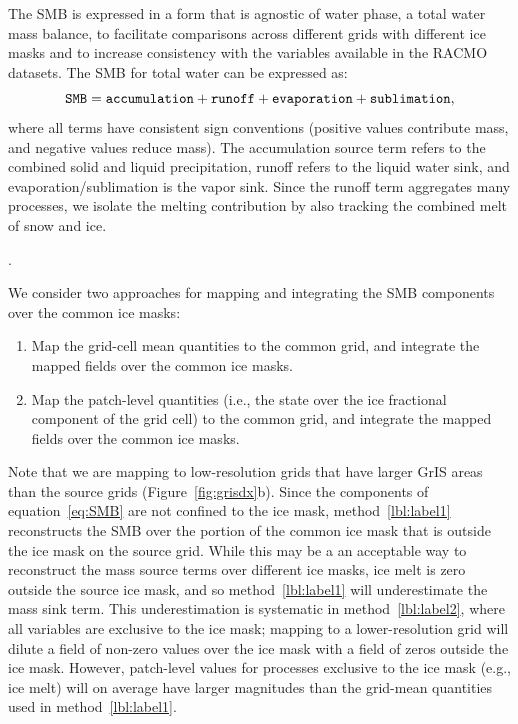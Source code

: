\documentclass[draft]{agujournal2019}
\begin{document}
The SMB is expressed in a form that is agnostic of water phase, a total water mass balance, to facilitate comparisons across different grids with different ice masks and to increase consistency with the variables available in the RACMO datasets. The SMB for total water can be expressed as:
\begin{equation}
\tt SMB = accumulation + runoff + evaporation + sublimation, \label{eq:SMB}
\end{equation}
where all terms have consistent sign conventions (positive values contribute mass, and negative values reduce mass). The accumulation source term refers to the combined solid and liquid precipitation, runoff refers to the liquid water sink, and evaporation/sublimation is the vapor sink. Since the runoff term aggregates many processes, we isolate the melting contribution by also tracking the combined melt of snow and ice. 

{}.

We consider two approaches for mapping and integrating the SMB components over the common ice masks:
\begin{enumerate}
\item Map the grid-cell mean quantities to the common grid, and integrate the mapped fields over the common ice masks. \label{lbl:label1}
\item Map the patch-level quantities (i.e., the state over the ice fractional component of the grid cell) to the common grid, and integrate the mapped fields over the common ice masks. \label{lbl:label2}
\end{enumerate}

Note that we are mapping to low-resolution grids that have larger GrIS areas than the source grids (Figure~\ref{fig:grisdx}b). Since the components of equation~\ref{eq:SMB} are not confined to the ice mask, method~\ref{lbl:label1} reconstructs the SMB over the portion of the common ice mask that is outside the ice mask on the source grid. While this may be a an acceptable way to reconstruct the mass source terms over different ice masks, ice melt is zero outside the source ice mask, and so method~\ref{lbl:label1} will underestimate the mass sink term. This underestimation is systematic in method~\ref{lbl:label2}, where all variables are exclusive to the ice mask; mapping to a lower-resolution grid will dilute a field of non-zero values over the ice mask with a field of zeros outside the ice mask. However, patch-level values for processes exclusive to the ice mask (e.g., ice melt) will on average have larger magnitudes than the grid-mean quantities used in method~\ref{lbl:label1}.
\end{document}
